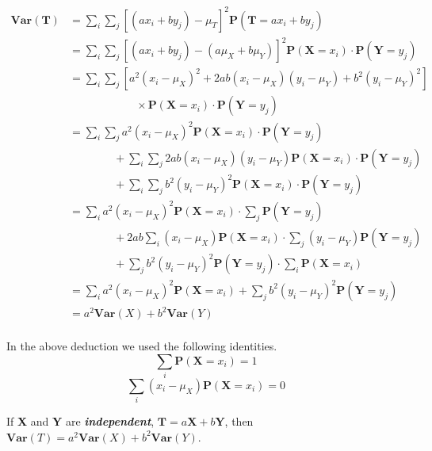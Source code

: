 \documentclass[a4paper, 12pt,twoside]{book}
\begin{document}
    \begin{equation*}
    \begin{split}
    \textbf{Var}(\textbf{T}) &= \sum_i \sum_j[(ax_i+by_j)-\mu_T]^2\textbf{P}(\textbf{T} = ax_i +by_j) \\
                             &= \sum_i \sum_j[(ax_i+by_j)-(a\mu_X + b\mu_Y)]^2\textbf{P}(\textbf{X} = x_i)\cdot \textbf{P}(\textbf{Y} = y_j)  \\
                             &= \sum_i \sum_j [a^2(x_i-\mu_X)^2 + 2ab(x_i-\mu_X)(y_i-\mu_Y) + b^2(y_i-\mu_Y)^2]\\
                             &\qquad\qquad\qquad\times\textbf{P}(\textbf{X} = x_i)\cdot \textbf{P}(\textbf{Y} = y_j)\\
                             &= \sum_i \sum_j a^2(x_i-\mu_X)^2 \textbf{P}(\textbf{X} = x_i)\cdot \textbf{P}(\textbf{Y} = y_j)  \\
                             &\qquad\qquad +\sum_i \sum_j 2ab(x_i-\mu_X)(y_i-\mu_Y) \textbf{P}(\textbf{X} = x_i)\cdot \textbf{P}(\textbf{Y} = y_j)\\
                             &\qquad\qquad+ \sum_i \sum_j  b^2(y_i-\mu_Y)^2 \textbf{P}(\textbf{X} = x_i)\cdot \textbf{P}(\textbf{Y} = y_j) \\
                             &=\sum_i a^2(x_i-\mu_X)^2 \textbf{P}(\textbf{X} = x_i)\cdot \sum_j \textbf{P}(\textbf{Y} = y_j) \\
                             &\qquad\qquad +2ab\sum_i (x_i-\mu_X) \textbf{P}(\textbf{X} = x_i)\cdot \sum_j(y_i-\mu_Y)\textbf{P}(\textbf{Y}= y_j)\\
                              &\qquad\qquad +\sum_j  b^2(y_i-\mu_Y)^2 \textbf{P}(\textbf{Y} = y_j) \cdot \sum_i\textbf{P}(\textbf{X}=x_i)\\
                              & = \sum_i a^2(x_i-\mu_X)^2 \textbf{P}(\textbf{X} = x_i)+\sum_j  b^2(y_i-\mu_Y)^2 \textbf{P}(\textbf{Y} = y_j)\\
                              &= a^2 \textbf{Var}(X) + b^2\textbf{Var}(Y)
    \end{split}
    \end{equation*}
    \vspace{0.6cm}\\
    In the above deduction we used the following identities.
    $$\sum_i \textbf{P}(\textbf{X} = x_i) = 1$$
    $$\sum_i (x_i-\mu_X)\textbf{P}(\textbf{X} = x_i) = 0$$
    \colorbox{babypink}{\parbox{\textwidth}{
        If \textbf{X} and \textbf{Y} are \textbf{\textit{independent}}, $\textbf{T}=a\textbf{X}+b\textbf{Y}$, then $\textbf{Var}(T) = a^2\textbf{Var}(X) + b^2\textbf{Var}(Y)$.\\
    }}
\end{document}
